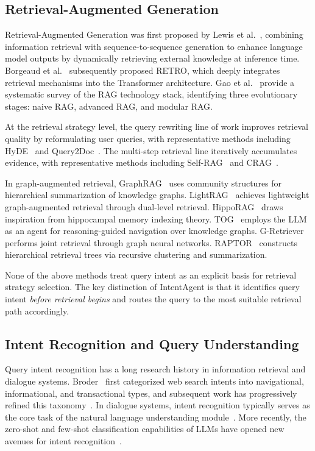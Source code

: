 \documentclass[runningheads]{llncs}
\begin{document}
\subsection{Retrieval-Augmented Generation}

Retrieval-Augmented Generation was first proposed by Lewis et al.~\cite{ref1}, combining information retrieval with sequence-to-sequence generation to enhance language model outputs by dynamically retrieving external knowledge at inference time. Borgeaud et al.~\cite{ref3} subsequently proposed RETRO, which deeply integrates retrieval mechanisms into the Transformer architecture. Gao et al.~\cite{ref2} provide a systematic survey of the RAG technology stack, identifying three evolutionary stages: naive RAG, advanced RAG, and modular RAG.

At the retrieval strategy level, the query rewriting line of work improves retrieval quality by reformulating user queries, with representative methods including HyDE~\cite{ref4} and Query2Doc~\cite{ref5}. The multi-step retrieval line iteratively accumulates evidence, with representative methods including Self-RAG~\cite{ref6} and CRAG~\cite{ref7}.

In graph-augmented retrieval, GraphRAG~\cite{ref27} uses community structures for hierarchical summarization of knowledge graphs. LightRAG~\cite{ref26} achieves lightweight graph-augmented retrieval through dual-level retrieval. HippoRAG~\cite{ref28} draws inspiration from hippocampal memory indexing theory. TOG~\cite{ref24} employs the LLM as an agent for reasoning-guided navigation over knowledge graphs. G-Retriever~\cite{ref25} performs joint retrieval through graph neural networks. RAPTOR~\cite{ref23} constructs hierarchical retrieval trees via recursive clustering and summarization.

None of the above methods treat query intent as an explicit basis for retrieval strategy selection. The key distinction of IntentAgent is that it identifies query intent \emph{before retrieval begins} and routes the query to the most suitable retrieval path accordingly.

\subsection{Intent Recognition and Query Understanding}

Query intent recognition has a long research history in information retrieval and dialogue systems. Broder~\cite{ref8} first categorized web search intents into navigational, informational, and transactional types, and subsequent work has progressively refined this taxonomy~\cite{ref9,ref10}. In dialogue systems, intent recognition typically serves as the core task of the natural language understanding module~\cite{ref11}. More recently, the zero-shot and few-shot classification capabilities of LLMs have opened new avenues for intent recognition~\cite{ref12}.
\end{document}
